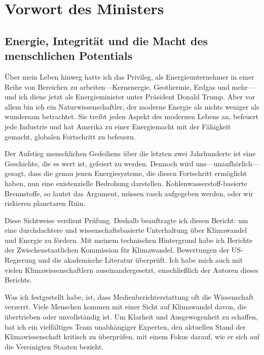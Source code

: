 \documentclass[12pt,paper=a4,DIV=12,parskip=never,chapterprefix=false,headings=standardclasses]{scrreprt}
\makeatletter
\renewcommand*{\tableofcontents}{%
  \begingroup
    \small      %
    \sloppy     %
    \chapter*{\contentsname}%
    \@starttoc{toc}%
  \endgroup
}
\makeatother
\begin{document}
\newpage
\thispagestyle{empty}
\mbox{}
\newpage

\tableofcontents
\cleardoublepage
{}   %
\chapter*{Vorwort des Ministers}
\section*{Energie, Integrität und die Macht des menschlichen Potentials}
Über mein Leben hinweg hatte ich das Privileg, als Energieunternehmer in einer Reihe von Bereichen zu arbeiten—Kernenergie, Geothermie, Erdgas und mehr—und ich diene jetzt als Energieminister unter Präsident Donald Trump. Aber vor allem bin ich ein Naturwissenschaftler, der moderne Energie als nichts weniger als wundersam betrachtet. Sie treibt jeden Aspekt des modernen Lebens an, befeuert jede Industrie und hat Amerika zu einer Energiemacht mit der Fähigkeit gemacht, globalen Fortschritt zu befeuern.

Der Aufstieg menschlichen Gedeihens über die letzten zwei Jahrhunderte ist eine Geschichte, die es wert ist, gefeiert zu werden. Dennoch wird uns—unaufhörlich—gesagt, dass die genau jenen Energiesysteme, die diesen Fortschritt ermöglicht haben, nun eine existenzielle Bedrohung darstellen. Kohlenwasserstoff-basierte Brennstoffe, so lautet das Argument, müssen rasch aufgegeben werden, oder wir riskieren planetaren Ruin.

Diese Sichtweise verdient Prüfung. Deshalb beauftragte ich diesen Bericht: um eine durchdachtere und wissenschaftsbasierte Unterhaltung über Klimawandel und Energie zu fördern. Mit meinem technischen Hintergrund habe ich Berichte der Zwischenstaatlichen Kommission für Klimawandel, Bewertungen der US-Regierung und die akademische Literatur überprüft. Ich habe mich auch mit vielen Klimawissenschaftlern auseinandergesetzt, einschließlich der Autoren dieses Berichts.

Was ich festgestellt habe, ist, dass Medienberichterstattung oft die Wissenschaft verzerrt. Viele Menschen kommen mit einer Sicht auf Klimawandel davon, die übertrieben oder unvollständig ist. Um Klarheit und Ausgewogenheit zu schaffen, bat ich ein vielfältiges Team unabhängiger Experten, den aktuellen Stand der Klimawissenschaft kritisch zu überprüfen, mit einem Fokus darauf, wie er sich auf die Vereinigten Staaten bezieht.
\end{document}

